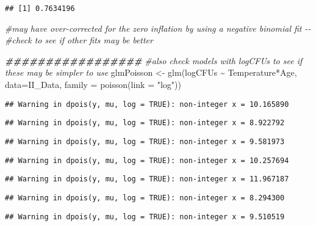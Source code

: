 \documentclass[
]{article}
\newenvironment{Shaded}{\begin{snugshade}}{\end{snugshade}}
\newcommand{\AttributeTok}[1]{\textcolor[rgb]{0.77,0.63,0.00}{#1}}
\newcommand{\CommentTok}[1]{\textcolor[rgb]{0.56,0.35,0.01}{\textit{#1}}}
\newcommand{\DocumentationTok}[1]{\textcolor[rgb]{0.56,0.35,0.01}{\textbf{\textit{#1}}}}
\newcommand{\FunctionTok}[1]{\textcolor[rgb]{0.00,0.00,0.00}{#1}}
\newcommand{\NormalTok}[1]{#1}
\newcommand{\OtherTok}[1]{\textcolor[rgb]{0.56,0.35,0.01}{#1}}
\newcommand{\SpecialCharTok}[1]{\textcolor[rgb]{0.00,0.00,0.00}{#1}}
\newcommand{\StringTok}[1]{\textcolor[rgb]{0.31,0.60,0.02}{#1}}
\begin{document}
\begin{verbatim}
## [1] 0.7634196
\end{verbatim}

\begin{Shaded}
\begin{Highlighting}[]
\CommentTok{\#may have over{-}corrected for the zero inflation by using a negative binomial fit {-}{-}}
\CommentTok{\#check to see if other fits may be better}

\DocumentationTok{\#\#\#\#\#\#\#\#\#\#\#\#\#\#\#\#\#}
\CommentTok{\#also check models with logCFUs to see if these may be simpler to use}
\NormalTok{glmPoisson }\OtherTok{\textless{}{-}} \FunctionTok{glm}\NormalTok{(logCFUs }\SpecialCharTok{\textasciitilde{}}\NormalTok{ Temperature}\SpecialCharTok{*}\NormalTok{Age, }\AttributeTok{data=}\NormalTok{II\_Data, }\AttributeTok{family =} \FunctionTok{poisson}\NormalTok{(}\AttributeTok{link =} \StringTok{"log"}\NormalTok{))}
\end{Highlighting}
\end{Shaded}

\begin{verbatim}
## Warning in dpois(y, mu, log = TRUE): non-integer x = 10.165890
\end{verbatim}

\begin{verbatim}
## Warning in dpois(y, mu, log = TRUE): non-integer x = 8.922792
\end{verbatim}

\begin{verbatim}
## Warning in dpois(y, mu, log = TRUE): non-integer x = 9.581973
\end{verbatim}

\begin{verbatim}
## Warning in dpois(y, mu, log = TRUE): non-integer x = 10.257694
\end{verbatim}

\begin{verbatim}
## Warning in dpois(y, mu, log = TRUE): non-integer x = 11.967187
\end{verbatim}

\begin{verbatim}
## Warning in dpois(y, mu, log = TRUE): non-integer x = 8.294300
\end{verbatim}

\begin{verbatim}
## Warning in dpois(y, mu, log = TRUE): non-integer x = 9.510519
\end{verbatim}
\end{document}
